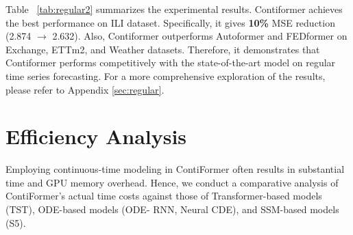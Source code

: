 \documentclass{article}
\begin{document}
Table ~\ref{tab:regular2} summarizes the experimental results. Contiformer achieves the best performance on ILI dataset. Specifically, it gives \textbf{10\%} MSE reduction (2.874 $\rightarrow$ 2.632). Also, Contiformer outperforms Autoformer and FEDformer on Exchange, ETTm2, and Weather datasets. Therefore, it demonstrates that Contiformer performs competitively with the state-of-the-art model on regular time series forecasting. For a more comprehensive exploration of the results, please refer to Appendix \ref{sec:regular}.

\section{Efficiency Analysis}

\begin{table}
\centering
\vspace{-10pt}
\caption{Actual time cost during training for different models on RacketSports dataset (0\% dropped) from UEA dataset. We adopt RK4 solver for ODE-RNN, Neural CDE, and ContiFormer. Step size refers to the amount of time increment for the RK4 solver. $\uparrow$ ($\downarrow$) indicates the higher (lower) the better.}
\label{tab:timecost}
\vspace{-5pt}
\end{table}

Employing continuous-time modeling in ContiFormer often results in substantial time and GPU memory overhead. Hence, we conduct a comparative analysis of ContiFormer's actual time costs against those of Transformer-based models (TST), ODE-based models (ODE-
RNN, Neural CDE), and SSM-based models (S5). 
\end{document}
